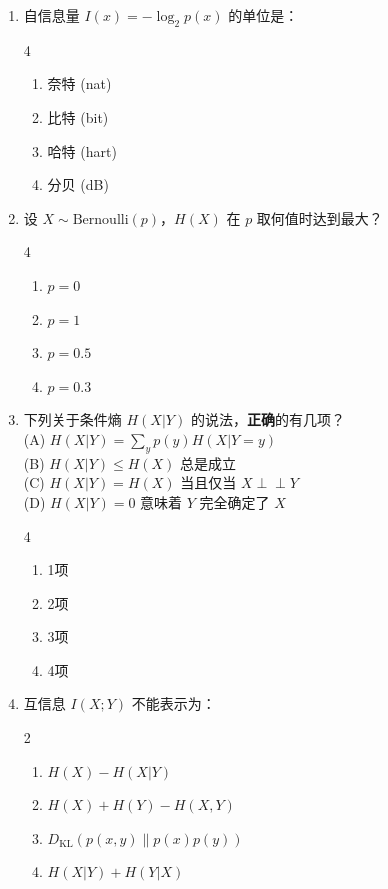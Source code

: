 \documentclass[12pt,a4paper]{ctexart}
\newcommand{\DKL}{D_{\mathrm{KL}}}
\newcommand{\indep}{\perp\!\!\!\perp}
\begin{document}
\begin{enumerate}[label=\arabic*., leftmargin=*]

\item 自信息量 $I(x) = -\log_2 p(x)$ 的单位是：
\begin{multicols}{4}
\begin{enumerate}[label=(\Alph*)]
  \item 奈特 (nat)
  \item 比特 (bit)
  \item 哈特 (hart)
  \item 分贝 (dB)
\end{enumerate}
\end{multicols}

\item 设 $X \sim \mathrm{Bernoulli}(p)$，$H(X)$ 在 $p$ 取何值时达到最大？
\begin{multicols}{4}
\begin{enumerate}[label=(\Alph*)]
  \item $p = 0$
  \item $p = 1$
  \item $p = 0.5$
  \item $p = 0.3$
\end{enumerate}
\end{multicols}

\item 下列关于条件熵 $H(X|Y)$ 的说法，\textbf{正确}的有几项？\\
(A) $H(X|Y) = \sum_y p(y) H(X|Y=y)$\\
(B) $H(X|Y) \leq H(X)$ 总是成立\\
(C) $H(X|Y) = H(X)$ 当且仅当 $X \indep Y$\\
(D) $H(X|Y) = 0$ 意味着 $Y$ 完全确定了 $X$
\begin{multicols}{4}
\begin{enumerate}[label=(\Alph*)]
  \item 1项
  \item 2项
  \item 3项
  \item 4项
\end{enumerate}
\end{multicols}

\item 互信息 $I(X;Y)$ 不能表示为：
\begin{multicols}{2}
\begin{enumerate}[label=(\Alph*)]
  \item $H(X) - H(X|Y)$
  \item $H(X) + H(Y) - H(X,Y)$
  \item $\DKL(p(x,y) \| p(x)p(y))$
  \item $H(X|Y) + H(Y|X)$
\end{enumerate}
\end{multicols}


\end{enumerate}
\end{document}
